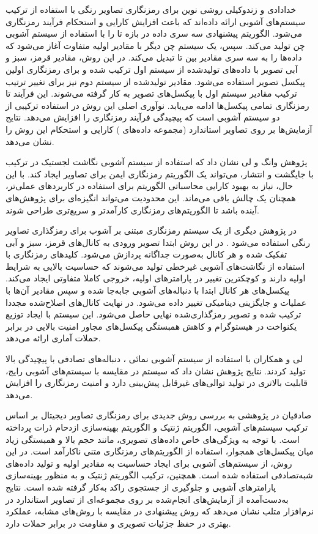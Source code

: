 خدادادی و زندوکیلی \cite{ref7} روشی نوین برای رمزنگاری تصاویر رنگی با استفاده از ترکیب سیستم‌های آشوبی ارائه داده‌اند که باعث افزایش کارایی و استحکام فرآیند رمزنگاری می‌شود. الگوریتم پیشنهادی سه سری داده در بازه  تا  را با استفاده از سیستم آشوبی چن تولید می‌کند. سپس، یک سیستم چن دیگر با مقادیر اولیه متفاوت آغاز می‌شود که داده‌ها را به سه سری مقادیر بین  تا  تبدیل می‌کند. در این روش، مقادیر قرمز، سبز و آبی تصویر با داده‌های تولیدشده از سیستم اول ترکیب شده و برای رمزنگاری اولین پیکسل تصویر استفاده می‌شود. مقادیر تولیدشده از سیستم دوم نیز برای تغییر ترتیب ترکیب مقادیر سیستم اول با پیکسل‌های تصویر به کار گرفته می‌شوند. این فرآیند تا رمزنگاری تمامی پیکسل‌ها ادامه می‌یابد. نوآوری اصلی این روش در استفاده ترکیبی از دو سیستم آشوبی است که پیچیدگی فرآیند رمزنگاری را افزایش می‌دهد. نتایج آزمایش‌ها بر روی تصاویر استاندارد (مجموعه داده‌های ) کارایی و استحکام این روش را نشان می‌دهد.

پژوهش وانگ و لی \cite{ref8} نشان داد که استفاده از سیستم آشوبی نگاشت لجستیک در ترکیب با جایگشت و انتشار، می‌تواند یک الگوریتم رمزنگاری ایمن برای تصاویر ایجاد کند. با این حال، نیاز به بهبود کارایی محاسباتی الگوریتم برای استفاده در کاربردهای عملی‌تر، همچنان یک چالش باقی می‌ماند. این محدودیت می‌تواند انگیزه‌ای برای پژوهش‌های آینده باشد تا الگوریتم‌های رمزنگاری کارآمدتر و سریع‌تری طراحی شوند.

در پژوهش دیگری از یک سیستم رمزنگاری مبتنی بر آشوب برای رمزگذاری تصاویر رنگی استفاده می‌شود \cite{ref9}. در این روش ابتدا تصویر ورودی به کانال‌های قرمز، سبز و آبی تفکیک شده و هر کانال به‌صورت جداگانه پردازش می‌شود. کلیدهای رمزنگاری با استفاده از نگاشت‌های آشوبی غیرخطی تولید می‌شوند که حساسیت بالایی به شرایط اولیه دارند و کوچکترین تغییر در پارامترهای اولیه، خروجی کاملا متفاوتی ایجاد می‌کند. پیکسل‌های هر کانال ابتدا با دنباله‌های آشوبی جابه‌جا شده و سپس مقادیر آن‌ها با عملیات  و جایگزینی دینامیکی تغییر داده می‌شود. در نهایت کانال‌های اصلاح‌شده مجددا ترکیب شده و تصویر رمزگذاری‌شده نهایی حاصل می‌شود. این سیستم با ایجاد توزیع یکنواخت در هیستوگرام و کاهش همبستگی پیکسل‌های مجاور امنیت بالایی در برابر حملات آماری ارائه می‌دهد.

لی و همکاران \cite{ref10} با استفاده از سیستم آشوبی نمائی  ، دنباله‌های تصادفی با پیچیدگی بالا تولید کردند. نتایج پژوهش نشان داد که سیستم  در مقایسه با سیستم‌های آشوبی رایج، قابلیت بالاتری در تولید توالی‌های غیرقابل پیش‌بینی دارد و امنیت رمزنگاری را افزایش می‌دهد.

صادقیان \cite{ref11} در پژوهشی به بررسی روش جدیدی برای رمزنگاری تصاویر دیجیتال بر اساس ترکیب سیستم‌های آشوبی، الگوریتم ژنتیک و الگوریتم بهینه‌سازی ازدحام ذرات پرداخته است.  با توجه به ویژگی‌های خاص داده‌های تصویری، مانند حجم بالا و همبستگی زیاد میان پیکسل‌های همجوار، استفاده از الگوریتم‌های رمزنگاری متنی ناکارآمد است. در این روش، از سیستم‌های آشوبی برای ایجاد حساسیت به مقادیر اولیه و تولید داده‌های شبه‌تصادفی استفاده شده است. همچنین، ترکیب الگوریتم ژنتیک و  به منظور بهینه‌سازی پارامترهای آشوبی و جلوگیری از جستجوی راکد به‌کار گرفته شده است. نتایج به‌دست‌آمده از آزمایش‌های انجام‌شده بر روی مجموعه‌ای از تصاویر استاندارد در نرم‌افزار متلب نشان می‌دهد که روش پیشنهادی در مقایسه با روش‌های مشابه، عملکرد بهتری در حفظ جزئیات تصویری و مقاومت در برابر حملات دارد.

